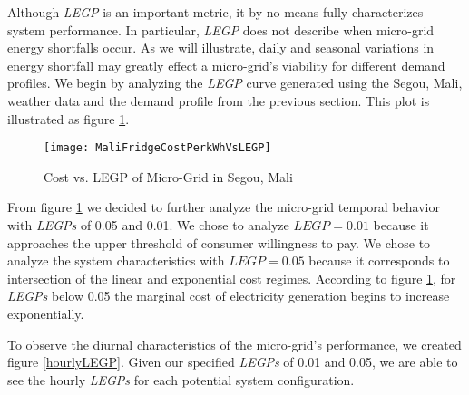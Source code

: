\documentclass{article}
\begin{document}

	







Although \emph{LEGP} is an important metric, it by no means fully characterizes system performance. 
In particular, \emph{LEGP} does not describe when micro-grid energy shortfalls occur.
As we will illustrate, daily and seasonal variations in energy shortfall may greatly effect a micro-grid's viability for different demand profiles. 
We begin by analyzing the \emph{LEGP} curve generated using the Segou, Mali, weather data and the demand profile from the previous section. 
This plot is illustrated as figure \ref{CostVLEGPMali}.

\begin{figure}[ht]  
  \centering
    \texttt{[image: MaliFridgeCostPerkWhVsLEGP]}
  \caption{Cost vs. LEGP of Micro-Grid in Segou, Mali}
  \label{CostVLEGPMali}
\end{figure}

From figure \ref{CostVLEGPMali} we decided to further analyze the micro-grid temporal behavior with \emph{LEGPs} of 0.05 and 0.01.
 We chose to analyze $LEGP = 0.01$ because it approaches the upper threshold of consumer willingness to pay.
We chose to analyze the system characteristics with $LEGP = 0.05$ because it corresponds to intersection of the linear and exponential cost regimes.
According to figure \ref{CostVLEGPMali}, for \emph{LEGPs} below 0.05 the marginal cost of electricity generation begins to increase exponentially.  

To observe the diurnal characteristics of the micro-grid's performance, we created figure \ref{hourlyLEGP}. Given our specified \emph{LEGPs} of 0.01 and 0.05, we are able to see the hourly \emph{LEGPs} for each potential system configuration.
\end{document}
